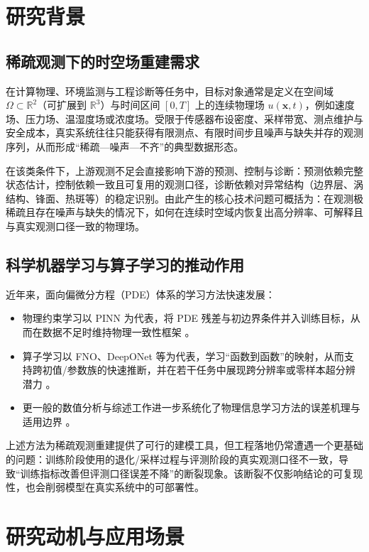 \section{研究背景}

\subsection{稀疏观测下的时空场重建需求}

在计算物理、环境监测与工程诊断等任务中，目标对象通常是定义在空间域
\(\Omega \subset \mathbb{R}^2\)（可扩展到 \(\mathbb{R}^3\)）与时间区间 \([0,T]\) 上的连续物理场
\(u(\mathbf{x},t)\)，例如速度场、压力场、温湿度场或浓度场。受限于传感器布设密度、采样带宽、测点维护与安全成本，真实系统往往只能获得有限测点、有限时间步且噪声与缺失并存的观测序列，从而形成“稀疏—噪声—不齐”的典型数据形态。

在该类条件下，上游观测不足会直接影响下游的预测、控制与诊断：预测依赖完整状态估计，控制依赖一致且可复用的观测口径，诊断依赖对异常结构（边界层、涡结构、锋面、热斑等）的稳定识别。由此产生的核心技术问题可概括为：在观测极稀疏且存在噪声与缺失的情况下，如何在连续时空域内恢复出高分辨率、可解释且与真实观测口径一致的物理场。

\subsection{科学机器学习与算子学习的推动作用}

近年来，面向偏微分方程（PDE）体系的学习方法快速发展：
\begin{itemize}
  \item 物理约束学习以 PINN 为代表，将 PDE 残差与初边界条件并入训练目标，从而在数据不足时维持物理一致性框架 \parencite{raissi2019pinn}。
  \item 算子学习以 FNO、DeepONet 等为代表，学习“函数到函数”的映射，从而支持跨初值/参数族的快速推断，并在若干任务中展现跨分辨率或零样本超分辨潜力 \parencite{li2021fno,lu2021deeponet}。
  \item 更一般的数值分析与综述工作进一步系统化了物理信息学习方法的误差机理与适用边界 \parencite{deryck2024acta_numerica}。
\end{itemize}

上述方法为稀疏观测重建提供了可行的建模工具，但工程落地仍常遭遇一个更基础的问题：训练阶段使用的退化/采样过程与评测阶段的真实观测口径不一致，导致“训练指标改善但评测口径误差不降”的断裂现象。该断裂不仅影响结论的可复现性，也会削弱模型在真实系统中的可部署性。

\section{研究动机与应用场景}


